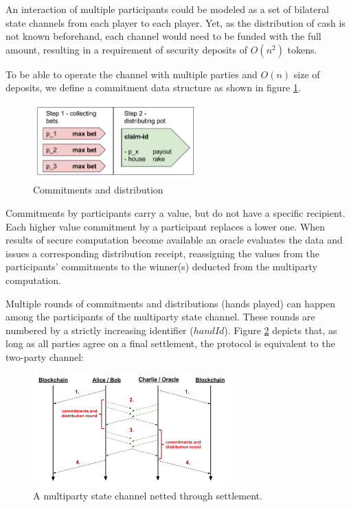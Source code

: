 An interaction of multiple participants could be modeled as a set of bilateral state channels from each player to each player. Yet, as the distribution of cash is not known beforehand, each channel would need to be funded with the full amount, resulting in a requirement of security deposits of \(O(n^2)\) tokens.

To be able to operate the channel with multiple parties and \(O(n)\) size of deposits, we define a commitment data structure as shown in figure \ref{mpc_round}. 

\begin{figure}[!ht]
\centering
\includegraphics[width=2.5in]{images/bet.png}
\caption{Commitments and distribution}
\label{mpc_round}
\end{figure}

Commitments by participants carry a value, but do not have a specific recipient. Each higher value commitment by a participant replaces a lower one. When results of secure computation become available an oracle evaluates the data and issues a corresponding distribution receipt, reassigning the values from the participants' commitments to the winner(s) deducted from the multiparty computation.

Multiple rounds of commitments and distributions (hands played) can happen among the participants of the multiparty state channel. These rounds are numbered by a strictly increasing identifier (\(handId\)). Figure \ref{mpc_settle} depicts that, as long as all parties agree on a final settlement, the protocol is equivalent to the two-party channel:

\begin{figure}[!ht]
\centering
\includegraphics[width=3.0in]{images/multiSettle.png}
\caption{A multiparty state channel netted through settlement.}
\label{mpc_settle}
\end{figure}

